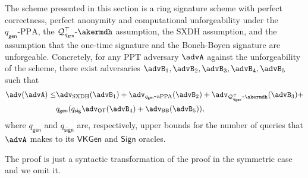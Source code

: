 \begin{theorem}
The scheme presented in this section is a ring signature scheme
with perfect correctness, perfect anonymity and computational unforgeability under the
$q_\mathsf{gen}\mbox{-}\mathrm{PPA}$, the $\mathcal{Q}_{q_\mathsf{gen}}^\top\mbox{-}\akermdh$ assumption, the $\mathrm{SXDH}$ assumption, and the assumption
that the one-time signature and the Boneh-Boyen signature are unforgeable.
Concretely, for any PPT adversary $\advA$ against the unforgeability of the scheme, there exist adversaries $\advB_1,\advB_2,\advB_3,\advB_4,\advB_5$ such that
\begin{align*}
\adv(\advA)\leq &\adv_{\mathrm{SXDH}}(\advB_1)+\adv_{q_\mathsf{gen}\mbox{-}\mathrm{aPPA}}(\advB_2)+\adv_{\mathcal{Q}^\top_{q_\mathsf{gen}}\mbox{-}\akermdh}(\advB_3)+\\
&q_\mathsf{gen}(q_\mathsf{sig}\adv_{\mathsf{OT}}(\advB_4)+\adv_{\mathsf{BB}}(\advB_5)),
\end{align*}
where $q_\mathsf{gen}$ and $q_\mathsf{sign}$ are, respectively, upper bounds for the number of queries that $\advA$ makes to its $\mathsf{VKGen}$ and $\mathsf{Sign}$ oracles.
\end{theorem}
The proof is just a syntactic transformation of the proof in the symmetric case and we omit it.
%
%
